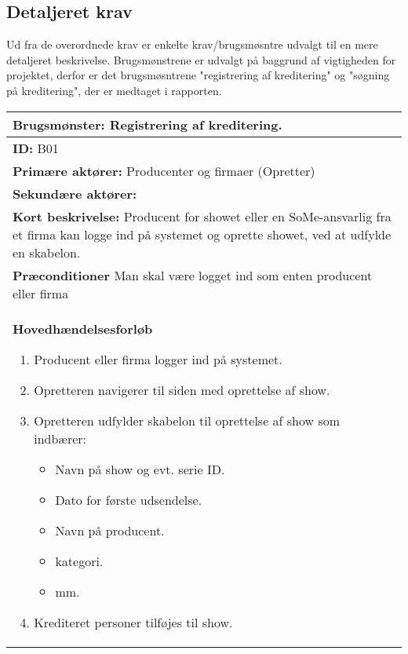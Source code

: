 \subsection{Detaljeret krav}

Ud fra de overordnede krav er enkelte krav/brugsmøsntre udvalgt til en mere detaljeret beskrivelse. Brugsmønstrene er udvalgt på baggrund af vigtigheden for projektet, derfor er det brugsmøsntrene "registrering af kreditering" og "søgning på kreditering", der er medtaget i rapporten. 

\begin{longtable}{|p{150mm}|}
\hline
\textbf{Brugsmønster:} Registrering af kreditering.           \\ \hline
\textbf{ID:} B01                                     \\ \hline
\textbf{Primære aktører:} Producenter og firmaer (Opretter)       \\ \hline
\textbf{Sekundære aktører:}      \\ \hline
\textbf{Kort beskrivelse:} Producent for showet eller en SoMe-ansvarlig fra et firma kan logge ind på systemet og oprette showet, ved at udfylde en skabelon.          \\ \hline
\textbf{Præconditioner} Man skal være logget ind som enten producent eller firma            \\ \hline
\textbf{Hovedhændelsesforløb}
    \begin{enumerate}
        \setlength{\itemsep}{0pt}
        \item Producent eller firma logger ind på systemet.
        \item Opretteren navigerer til siden med oprettelse af show.
        \item Opretteren udfylder skabelon til oprettelse af show som indbærer:
        \begin{itemize}
            \setlength{\itemsep}{0pt}
            \item Navn på show og evt. serie ID.
            \item Dato for første udsendelse.
            \item Navn på producent.
            \item kategori.
            \item mm.
        \end{itemize}
        \item Krediteret personer tilføjes til show.
        \begin{itemize}
            \setlength{\itemsep}{0pt}

\end{itemize}
\end{enumerate}
\end{longtable}
